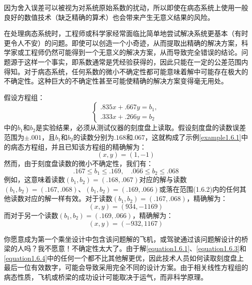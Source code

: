 因为舍入误差可以被视为对系统原始系数的扰动，所以即使在病态系统上使用一般良好的数值技术（缺乏精确的算术）也会带来产生无意义结果的风险。

在处理病态系统时，工程师或科学家经常面临比简单地尝试解决系统更基本（有时更令人不安）的问题。即使可以创造一个小奇迹，从而提取出精确的解决方案，科学家或工程师仍然可能得到一个无意义的解决方案，从而导致完全错误的结论。问题源于这样一个事实，即系数通常是凭经验获得的，因此只能在一定的公差范围内得知。对于病态系统，任何系数的微小不确定性都可能意味着解中可能存在极大的不确定性。这种巨大的不确定性甚至可能使精确的解决方案变得毫无用处。

\begin{example}
\label{example1.6.2}
假设方程组：
$$
\begin{cases} 
.835x + .667y = b_1, \\
.333x + .266y = b_2
\end{cases}
$$
中的$b_1$和$b_2$是实验结果，必须从测试仪器的刻度盘上读取。假设刻度盘的读数误差范围为$\pm .001$，且$b_1$和$b_2$的读数分别为$.168$和$.067$，这就构成了示例\ref{example1.6.1}中的病态方程组，并且已知该方程组的精确解为：
\begin{equation}
    (x,y) = (1,-1) \label{equation1.6.1}
\end{equation}
然而，由于刻度盘读数的微小不确定性，我们有：
\begin{equation}
.167 \leq b_1 \leq .169, \quad .066 \leq b_2 \leq .068 \label{equation1.6.2}    
\end{equation}
例如，这意味着读数$(b_1, b_2) = (.168, .067)$对应的解与读数$(b_1, b_2) = (.167, .068)$、$(b_1, b_2) = (.169, .066)$或落在范围(1.6.2)内的任何其他读数对应的解一样有效。对于读数$(b_1, b_2) = (.167, .068)$，精确解为：
\begin{equation}
    (x,y) = (934, -1169) \label{equation1.6.3}
\end{equation}
而对于另一个读数$(b_1, b_2) = (.169, .066)$，精确解为：
\begin{equation}
    (x,y) = (-932, 1167) \label{equation1.6.4}
\end{equation}

你愿意成为第一个乘坐设计中包含该问题解的飞机，或驾驶通过该问题解设计的桥梁的人吗？我不愿意！不确定性太大了。由于解\ref{equation1.6.1}、\ref{equation1.6.3}和\ref{equation1.6.4}中的任何一个都不比其他解更优，因此技术人员如何读取刻度盘上最后一位有效数字，可能会导致采用完全不同的设计方案。由于相关线性方程组的病态性质，飞机或桥梁的成功设计可能取决于运气，而非科学原理。
\end{example}

